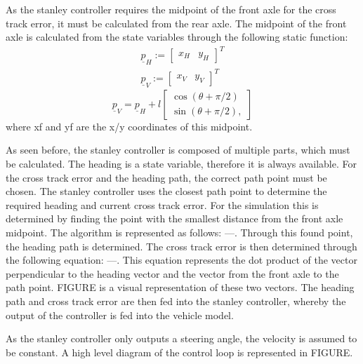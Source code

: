 \documentclass[arbeit=studie,oneside,BCOR=12mm]{ArbeitRST}
\begin{document}
As the stanley controller requires the midpoint of the front axle for the cross
track error, it must be calculated from the rear axle. The midpoint of the
front axle is calculated from the state variables through the following static
function:
\begin{gather}
    \underline{p}_H := 
    \begin{bmatrix}
        x_H & y_H
    \end{bmatrix}^T \\
    \underline{p}_V := 
    \begin{bmatrix}
        x_V & y_V
    \end{bmatrix}^T
    \label{eq:Hinterradachse und Vorderradachse}
\end{gather}
\begin{equation}
    \underline{p}_V = \underline{p}_H + l 
    \begin{bmatrix}
        \cos(\theta + \pi/2) \\ 
        \sin(\theta + \pi/2),
    \end{bmatrix}
    \label{eq:Transformation von Hinterradachse zu Vorderradachse}
\end{equation}
where xf and yf are the x/y coordinates of this midpoint. 

As seen before, the stanley controller is composed of multiple parts, which
must be calculated. The heading is a state variable, therefore it is always
available. For the cross track error and the heading path, the correct path
point must be chosen. The stanley controller uses the closest path point to
determine the required heading and current cross track error. For the
simulation this is determined by finding the point with the smallest distance
from the front axle midpoint. The algorithm is represented as follows: ---.
Through this found point, the heading path is determined. The cross track error
is then determined through the following equation: ---. This equation
represents the dot product of the vector perpendicular to the heading vector
and the vector from the front axle to the path point. FIGURE is a visual
representation of these two vectors. The heading path and cross track error are
then fed into the stanley controller, whereby the output of the controller is
fed into the vehicle model.

As the stanley controller only outputs a steering angle, the velocity is
assumed to be constant. A high level diagram of the control loop is represented
in FIGURE.
\end{document}
